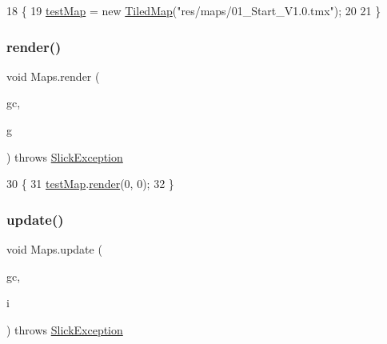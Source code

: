 \begin{DoxyCode}
18         \{
19             \mbox{\hyperlink{class_maps_aeee11ea1ad8b6b1384fc9fa1430c051e}{testMap}} = \textcolor{keyword}{new} \mbox{\hyperlink{classorg_1_1newdawn_1_1slick_1_1tiled_1_1_tiled_map}{TiledMap}}(\textcolor{stringliteral}{"res/maps/01\_Start\_V1.0.tmx"});
20             
21         \}
\end{DoxyCode}
\mbox{\label{class_maps_a30c4d2c956dfed68842e5faa9d45d8c0}} 
\subsubsection{\texorpdfstring{render()}{render()}}
{\footnotesize\ttfamily void Maps.\+render (\begin{DoxyParamCaption}\item[{\mbox{\hyperlink{classorg_1_1newdawn_1_1slick_1_1_game_container}{Game\+Container}}}]{gc,  }\item[{\mbox{\hyperlink{classorg_1_1newdawn_1_1slick_1_1_graphics}{Graphics}}}]{g }\end{DoxyParamCaption}) throws \mbox{\hyperlink{classorg_1_1newdawn_1_1slick_1_1_slick_exception}{Slick\+Exception}}\hspace{0.3cm}{\ttfamily [inline]}}


\begin{DoxyCode}
30     \{
31             \mbox{\hyperlink{class_maps_aeee11ea1ad8b6b1384fc9fa1430c051e}{testMap}}.\mbox{\hyperlink{classorg_1_1newdawn_1_1slick_1_1tiled_1_1_tiled_map_a313dd901616b31c772f213675d236389}{render}}(0, 0); 
32     \}
\end{DoxyCode}
\mbox{\label{class_maps_a9d5bad31330319e7927fc47ad04583d9}} 
\subsubsection{\texorpdfstring{update()}{update()}}
{\footnotesize\ttfamily void Maps.\+update (\begin{DoxyParamCaption}\item[{\mbox{\hyperlink{classorg_1_1newdawn_1_1slick_1_1_game_container}{Game\+Container}}}]{gc,  }\item[{int}]{i }\end{DoxyParamCaption}) throws \mbox{\hyperlink{classorg_1_1newdawn_1_1slick_1_1_slick_exception}{Slick\+Exception}}\hspace{0.3cm}{\ttfamily [inline]}}


